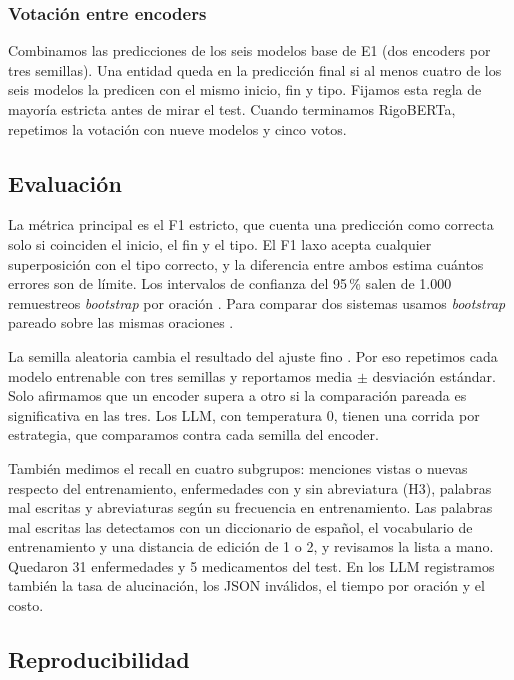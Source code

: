 \documentclass[10pt,journal,a4paper]{IEEEtran}
\begin{document}
\subsubsection{Votación entre encoders}
Combinamos las predicciones de los seis modelos base de E1 (dos encoders por tres semillas). Una entidad queda en la predicción final si al menos cuatro de los seis modelos la predicen con el mismo inicio, fin y tipo. Fijamos esta regla de mayoría estricta antes de mirar el test. Cuando terminamos RigoBERTa, repetimos la votación con nueve modelos y cinco votos.

\subsection{Evaluación}

La métrica principal es el F1 estricto, que cuenta una predicción como correcta solo si coinciden el inicio, el fin y el tipo. El F1 laxo acepta cualquier superposición con el tipo correcto, y la diferencia entre ambos estima cuántos errores son de límite. Los intervalos de confianza del 95\,\% salen de 1.000 remuestreos \emph{bootstrap} por oración \cite{efron1993}. Para comparar dos sistemas usamos \emph{bootstrap} pareado sobre las mismas oraciones \cite{bergkirkpatrick2012}.

La semilla aleatoria cambia el resultado del ajuste fino \cite{dodge2020,mosbach2021}. Por eso repetimos cada modelo entrenable con tres semillas y reportamos media $\pm$ desviación estándar. Solo afirmamos que un encoder supera a otro si la comparación pareada es significativa en las tres. Los LLM, con temperatura 0, tienen una corrida por estrategia, que comparamos contra cada semilla del encoder.

También medimos el recall en cuatro subgrupos: menciones vistas o nuevas respecto del entrenamiento, enfermedades con y sin abreviatura (H3), palabras mal escritas y abreviaturas según su frecuencia en entrenamiento. Las palabras mal escritas las detectamos con un diccionario de español, el vocabulario de entrenamiento y una distancia de edición de 1 o 2, y revisamos la lista a mano. Quedaron 31 enfermedades y 5 medicamentos del test. En los LLM registramos también la tasa de alucinación, los JSON inválidos, el tiempo por oración y el costo.

\subsection{Reproducibilidad}
\end{document}
